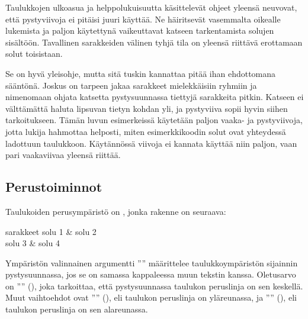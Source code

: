 Taulukkojen ulkoasua ja helppolukuisuutta käsittelevät ohjeet yleensä
neuvovat, että pystyviivoja ei pitäisi juuri käyttää. Ne häiritsevät
vasemmalta oikealle lukemista ja paljon käytettynä vaikeuttavat katseen
tarkentamista solujen sisältöön. Tavallinen sarakkeiden välinen tyhjä
tila on yleensä riittävä erottamaan solut toisistaan.

Se on hyvä yleisohje, mutta sitä tuskin kannattaa pitää ihan ehdottomana
sääntönä. Joskus on tarpeen jakaa sarakkeet mielekkäisiin ryhmiin ja
nimenomaan ohjata katsetta pystysuunnassa tiettyjä sarakkeita pitkin.
Katseen ei välttämättä haluta lipsuvan tietyn kohdan yli, ja pystyviiva
sopii hyvin siihen tarkoitukseen. Tämän luvun esimerkeissä käytetään
paljon vaaka- ja pystyviivoja, jotta lukija hahmottaa helposti, miten
esimerkkikoodin solut ovat yhteydessä ladottuun taulukkoon. Käytännössä
viivoja ei kannata käyttää niin paljon, vaan pari vaakaviivaa yleensä
riittää.

\subsection{Perustoiminnot}

Taulukoiden perusympäristö on , jonka rakenne on
seuraava:

\komentoi{\keno}
\begin{koodilohkosis}
\begin{tabular}[sijainti]{sarakkeet}
  solu 1 & solu 2 \\
  solu 3 & solu 4 \\
\end{tabular}
\end{koodilohkosis}

Ympäristön valinnainen argumentti '''' määrittelee
taulukkoympäristön sijainnin pystysuunnassa, jos se on samassa
kappaleessa muun tekstin kanssa. Oletusarvo on ''''
(), joka tarkoittaa, että pystysuunnassa taulukon
peruslinja on sen keskellä. Muut vaihtoehdot ovat ''''
(), eli taulukon peruslinja on yläreunassa, ja
'''' (), eli taulukon peruslinja on sen
alareunassa.


